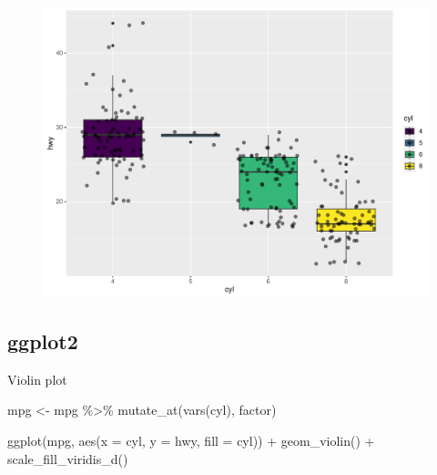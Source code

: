 \documentclass[
  letterpaper,
  DIV=11,
  numbers=noendperiod,
  landscape]{scrartcl}
\newenvironment{Shaded}{\begin{snugshade}}{\end{snugshade}}
\newcommand{\AttributeTok}[1]{\textcolor[rgb]{0.40,0.45,0.13}{#1}}
\newcommand{\FunctionTok}[1]{\textcolor[rgb]{0.28,0.35,0.67}{#1}}
\newcommand{\NormalTok}[1]{\textcolor[rgb]{0.00,0.23,0.31}{#1}}
\newcommand{\OtherTok}[1]{\textcolor[rgb]{0.00,0.23,0.31}{#1}}
\newcommand{\SpecialCharTok}[1]{\textcolor[rgb]{0.37,0.37,0.37}{#1}}
\begin{document}
\begin{figure}[H]

{\centering \includegraphics{RandRStudio_files/figure-pdf/unnamed-chunk-18-1.pdf}

}

\end{figure}

\hypertarget{ggplot2-8}{%
\subsection{ggplot2}\label{ggplot2-8}}

Violin plot

\begin{Shaded}
\begin{Highlighting}[]
\NormalTok{mpg }\OtherTok{\textless{}{-}}\NormalTok{ mpg }\SpecialCharTok{\%\textgreater{}\%} \FunctionTok{mutate\_at}\NormalTok{(}\FunctionTok{vars}\NormalTok{(cyl), factor)}

\FunctionTok{ggplot}\NormalTok{(mpg, }\FunctionTok{aes}\NormalTok{(}\AttributeTok{x =}\NormalTok{ cyl, }\AttributeTok{y =}\NormalTok{ hwy, }\AttributeTok{fill =}\NormalTok{ cyl)) }\SpecialCharTok{+}
  \FunctionTok{geom\_violin}\NormalTok{() }\SpecialCharTok{+}
  \FunctionTok{scale\_fill\_viridis\_d}\NormalTok{()}
\end{Highlighting}
\end{Shaded}
\end{document}
